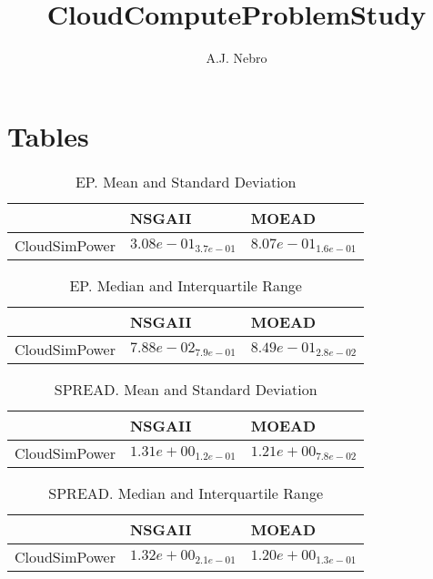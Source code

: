 \documentclass{article}
\title{CloudComputeProblemStudy}
\author{A.J. Nebro}
\begin{document}
\maketitle
\section{Tables}

\begin{table}
\caption{EP. Mean and Standard Deviation}
\label{table: EP}
\centering
\begin{scriptsize}
\begin{tabular}{lll}
\hline & NSGAII &  MOEAD\\
\hline 
CloudSimPower & \cellcolor{gray95}$  3.08e-01_{ 3.7e-01}$ & \cellcolor{gray25}$  8.07e-01_{ 1.6e-01}$ \\
\hline
\end{tabular}
\end{scriptsize}
\end{table}

\begin{table}
\caption{EP. Median and Interquartile Range}
\label{table: EP}
\centering
\begin{scriptsize}
\begin{tabular}{lll}
\hline & NSGAII &  MOEAD\\
\hline 
CloudSimPower & \cellcolor{gray95}$  7.88e-02_{ 7.9e-01}$ & \cellcolor{gray25}$  8.49e-01_{ 2.8e-02}$ \\
\hline
\end{tabular}
\end{scriptsize}
\end{table}

\begin{table}
\caption{SPREAD. Mean and Standard Deviation}
\label{table: SPREAD}
\centering
\begin{scriptsize}
\begin{tabular}{lll}
\hline & NSGAII &  MOEAD\\
\hline 
CloudSimPower & \cellcolor{gray25}$  1.31e+00_{ 1.2e-01}$ & \cellcolor{gray95}$  1.21e+00_{ 7.8e-02}$ \\
\hline
\end{tabular}
\end{scriptsize}
\end{table}

\begin{table}
\caption{SPREAD. Median and Interquartile Range}
\label{table: SPREAD}
\centering
\begin{scriptsize}
\begin{tabular}{lll}
\hline & NSGAII &  MOEAD\\
\hline 
CloudSimPower & \cellcolor{gray25}$  1.32e+00_{ 2.1e-01}$ & \cellcolor{gray95}$  1.20e+00_{ 1.3e-01}$ \\
\hline
\end{tabular}
\end{scriptsize}
\end{table}
\end{document}
